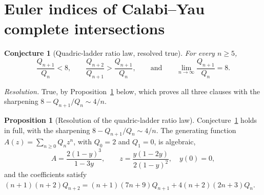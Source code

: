 \documentclass[11pt]{article}
\newtheorem{conjecture}{Conjecture}
\theoremstyle{definition}
\newtheorem{proposition}{Proposition}
\begin{document}
\section{Euler indices of Calabi--Yau complete intersections}

\begin{conjecture}[Quadric-ladder ratio law, resolved true]\label{x1}
For every $n\ge5$,
\[
\frac{Q_{n+1}}{Q_n}<8,
\qquad
\frac{Q_{n+2}}{Q_{n+1}}>\frac{Q_{n+1}}{Q_n},
\qquad\text{and}\qquad
\lim_{n\to\infty}\frac{Q_{n+1}}{Q_n}=8.
\]
\end{conjecture}

\emph{Resolution.} True, by Proposition~\ref{x:qladder} below, which proves all three clauses with the sharpening $8-Q_{n+1}/Q_n\sim4/n$.

\begin{proposition}[Resolution of the quadric-ladder ratio law]\label{x:qladder}
Conjecture~\ref{x1} holds in full, with the sharpening $8-Q_{n+1}/Q_n\sim4/n$.  The generating function $A(z)=\sum_{n\ge0}Q_nz^n$, with $Q_0=2$ and $Q_1=0$, is algebraic,
\[
A=\frac{2(1-y)^3}{1-3y},\qquad z=\frac{y(1-2y)}{2(1-y)^2},\quad y(0)=0,
\]
and the coefficients satisfy $(n+1)(n+2)Q_{n+2}=(n+1)(7n+9)Q_{n+1}+4(n+2)(2n+3)Q_n$.
\end{proposition}
\end{document}
